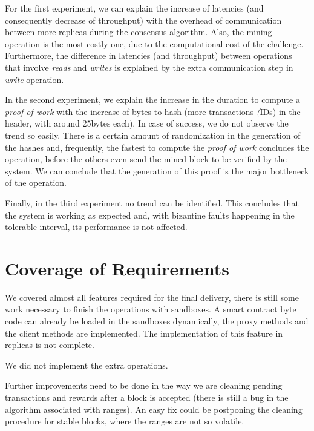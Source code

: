 \documentclass[10pt,journal,compsoc]{IEEEtran}
\begin{document}
	For the first experiment, we can explain the increase of latencies (and consequently decrease of throughput) with the overhead of communication between more replicas during the consensus algorithm. Also, the mining operation is the most costly one, due to the computational cost of the challenge.
	Furthermore, the difference in latencies (and throughput) between operations that involve  \textit{reads} and \textit{writes} is explained by the extra communication step in \textit{write} operation.

	In the second experiment, we explain the increase in the duration to compute a \textit{proof of work} with the increase of bytes to hash (more transactions \textit(IDs) in the header, with around 25bytes each). In case of success, we do not observe the trend so easily. There is a certain amount of randomization in the generation of the hashes and, frequently, the fastest to compute the \textit{proof of work} concludes the operation, before the others even send the mined block to be verified by the system. We can conclude that the generation of this proof is the major bottleneck of the operation.

	Finally, in the third experiment no trend can be identified. This concludes that the system is working as expected and, with bizantine faults happening in the tolerable interval, its performance is not affected.
	
	\section{Coverage of Requirements}
	
	We covered almost all features required for the final delivery, there is still some work necessary to finish the operations with sandboxes. A smart contract byte code can already be loaded in the sandboxes dynamically, the proxy methods and the client methods are implemented. The implementation of this feature in replicas is not complete.

	We did not implement the extra operations.


	Further improvements need to be done in the way we are cleaning pending transactions and rewards after a block is accepted (there is still a bug in the algorithm associated with ranges). An easy fix could be postponing the cleaning procedure for stable blocks, where the ranges are not so volatile. 
\end{document}
